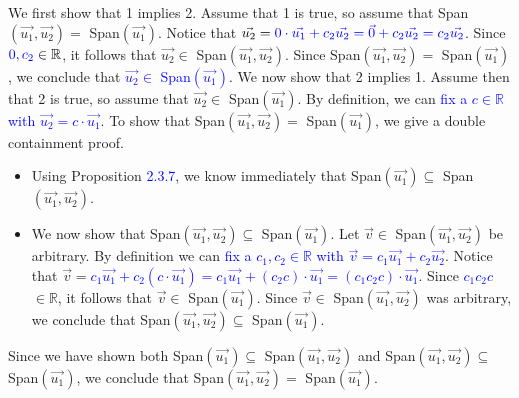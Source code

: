 \documentclass[12pt]{article}
\newenvironment{problem}[2][Problem]
{
	\begin{trivlist} 
		\item[\hskip \labelsep {\bfseries #1 #2:}]
	}
{
	\end{trivlist}
	}
\newenvironment{solution}[1][Solution]
{
	\begin{trivlist} 
		\item[\hskip \labelsep {\itshape #1:}]
	}
	{
	\end{trivlist}
}
\begin{document}
\begin{problem}{4}
\begin{solution}
We first show that 1 implies 2. Assume that 1 is true, so assume that Span$(\vec{u_{1}}, \vec{u_{2}}) =$ Span$(\vec{u_{1}})$. Notice that $\vec{u_{2}}= \textcolor{blue}{0\cdot \vec{u_{1}}+c_{2} \vec{u_{2}} = \vec{0} + c_{2} \vec{u_{2}} = c_{2} \vec{u_{2}}}$. Since $\textcolor{blue}{0,c_{2}} \in \mathbb{R}$, it follows that $\vec{u_{2}} \in$ Span$(\vec{u_{1}}, \vec{u_{2}})$. Since Span$(\vec{u_{1}}, \vec{u_{2}})=$ Span$(\vec{u_{1}})$, we conclude that \textcolor{blue}{$\vec{u_{2}} \in$ Span$(\vec{u_{1}})$}.
\noindent
\newline
\newline
We now show that 2 implies 1. Assume then that 2 is true, so assume that $\vec{u_{2}} \in$ Span$(\vec{u_{1}})$. By definition, we can \textcolor{blue}{fix a $c \in \mathbb{R}$ with $\vec{u_{2}}= c \cdot \vec{u_{1}}$}. To show that Span$(\vec{u_{1}}, \vec{u_{2}})=$ Span$(\vec{u_{1}})$, we give a double containment proof.
\begin{itemize}
\item Using Proposition \textcolor{blue}{2.3.7}, we know immediately that Span$(\vec{u_{1}}) \subseteq$ Span$(\vec{u_{1}}, \vec{u_{2}})$.
\item We now show that Span$(\vec{u_{1}}, \vec{u_{2}}) \subseteq$ Span$(\vec{u_{1}})$. Let $\vec{v} \in$ Span$(\vec{u_{1}},\vec{u_{2}})$ be arbitrary. By definition we can \textcolor{blue}{fix a $c_{1},c_{2} \in \mathbb{R}$ with $\vec{v}=c_{1}\vec{u_{1}} +c_{2}\vec{u_{2}}$}. Notice that $\vec{v} = $\textcolor{blue}{$c_{1}\vec{u_{1}} +c_{2}(c \cdot \vec{u_{1}}) = c_{1}\vec{u_{1}} +(c_{2}c) \cdot \vec{u_{1}} = (c_{1}c_{2}c) \cdot \vec{u_{1}}$}. Since  \textcolor{blue}{$c_{1}c_{2}c$} $\in \mathbb{R}$, it follows that $\vec{v} \in$ Span$(\vec{u_{1}})$. Since $\vec{v} \in$ Span$(\vec{u_{1}}, \vec{u_{2}})$ was arbitrary, we conclude that Span$(\vec{u_{1}}, \vec{u_{2}}) \subseteq$ Span$(\vec{u_{1}})$.
\end{itemize}
\noindent
Since we have shown both Span$(\vec{u_{1}}) \subseteq$ Span$(\vec{u_{1}}, \vec{u_{2}})$ and Span$(\vec{u_{1}}, \vec{u_{2}}) \subseteq$ Span$(\vec{u_{1}})$, we conclude that Span$(\vec{u_{1}}, \vec{u_{2}}) =$ Span$(\vec{u_{1}})$.



\end{solution}
\end{problem}
\end{document}
